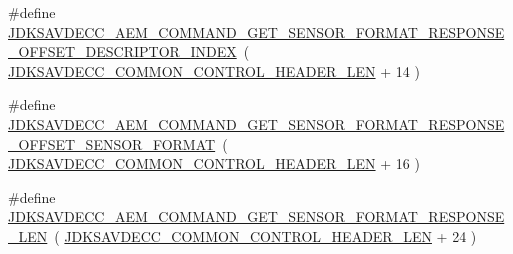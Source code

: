 \begin{DoxyCompactItemize}
\item 
\#define \hyperlink{group__command__get__sensor__format__response_ga8522e66851b5c775f947a56a281a1738}{J\+D\+K\+S\+A\+V\+D\+E\+C\+C\+\_\+\+A\+E\+M\+\_\+\+C\+O\+M\+M\+A\+N\+D\+\_\+\+G\+E\+T\+\_\+\+S\+E\+N\+S\+O\+R\+\_\+\+F\+O\+R\+M\+A\+T\+\_\+\+R\+E\+S\+P\+O\+N\+S\+E\+\_\+\+O\+F\+F\+S\+E\+T\+\_\+\+D\+E\+S\+C\+R\+I\+P\+T\+O\+R\+\_\+\+I\+N\+D\+EX}~( \hyperlink{group__jdksavdecc__avtp__common__control__header_gaae84052886fb1bb42f3bc5f85b741dff}{J\+D\+K\+S\+A\+V\+D\+E\+C\+C\+\_\+\+C\+O\+M\+M\+O\+N\+\_\+\+C\+O\+N\+T\+R\+O\+L\+\_\+\+H\+E\+A\+D\+E\+R\+\_\+\+L\+EN} + 14 )
\item 
\#define \hyperlink{group__command__get__sensor__format__response_gac3fd1fba56ce31236f4b889b98dd8a51}{J\+D\+K\+S\+A\+V\+D\+E\+C\+C\+\_\+\+A\+E\+M\+\_\+\+C\+O\+M\+M\+A\+N\+D\+\_\+\+G\+E\+T\+\_\+\+S\+E\+N\+S\+O\+R\+\_\+\+F\+O\+R\+M\+A\+T\+\_\+\+R\+E\+S\+P\+O\+N\+S\+E\+\_\+\+O\+F\+F\+S\+E\+T\+\_\+\+S\+E\+N\+S\+O\+R\+\_\+\+F\+O\+R\+M\+AT}~( \hyperlink{group__jdksavdecc__avtp__common__control__header_gaae84052886fb1bb42f3bc5f85b741dff}{J\+D\+K\+S\+A\+V\+D\+E\+C\+C\+\_\+\+C\+O\+M\+M\+O\+N\+\_\+\+C\+O\+N\+T\+R\+O\+L\+\_\+\+H\+E\+A\+D\+E\+R\+\_\+\+L\+EN} + 16 )
\item 
\#define \hyperlink{group__command__get__sensor__format__response_ga283242364a33a9cd1ee46ec03b0e858f}{J\+D\+K\+S\+A\+V\+D\+E\+C\+C\+\_\+\+A\+E\+M\+\_\+\+C\+O\+M\+M\+A\+N\+D\+\_\+\+G\+E\+T\+\_\+\+S\+E\+N\+S\+O\+R\+\_\+\+F\+O\+R\+M\+A\+T\+\_\+\+R\+E\+S\+P\+O\+N\+S\+E\+\_\+\+L\+EN}~( \hyperlink{group__jdksavdecc__avtp__common__control__header_gaae84052886fb1bb42f3bc5f85b741dff}{J\+D\+K\+S\+A\+V\+D\+E\+C\+C\+\_\+\+C\+O\+M\+M\+O\+N\+\_\+\+C\+O\+N\+T\+R\+O\+L\+\_\+\+H\+E\+A\+D\+E\+R\+\_\+\+L\+EN} + 24 )
\end{DoxyCompactItemize}
